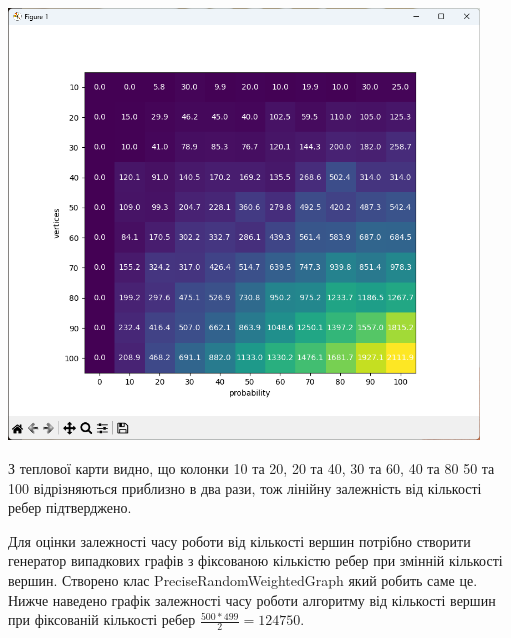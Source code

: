 \documentclass{article}
\begin{document}
\begin{center}
    \includegraphics[width=125mm]{map}
\end{center}

З теплової карти видно, що колонки 10 та 20, 20 та 40, 30 та 60, 40 та 80 50 та 100 відрізняються приблизно в два рази, тож лінійну залежність від кількості ребер підтверджено.\\\indent

Для оцінки залежності часу роботи від кількості вершин потрібно створити генератор випадкових графів з фіксованою кількістю ребер при змінній кількості вершин. Створено клас PreciseRandomWeightedGraph який робить саме це. Нижче наведено графік залежності часу роботи алгоритму від кількості вершин при фіксованій кількості ребер $\frac{500*499}{2} = 124750$.
\end{document}

